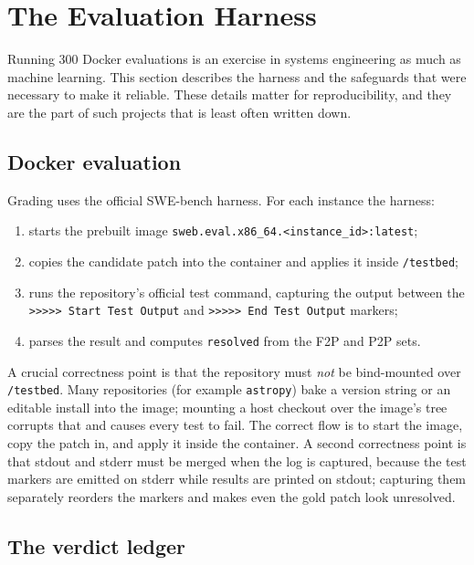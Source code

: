 \documentclass[11pt,a4paper]{article}
\begin{document}
\section{The Evaluation Harness}
\label{sec:harness}

Running 300 Docker evaluations is an exercise in systems engineering as much as machine
learning. This section describes the harness and the safeguards that were necessary to
make it reliable. These details matter for reproducibility, and they are the part of such
projects that is least often written down.

\subsection{Docker evaluation}

Grading uses the official SWE-bench harness. For each instance the harness:

\begin{enumerate}[leftmargin=1.4em]
  \item starts the prebuilt image \texttt{sweb.eval.x86\_64.<instance\_id>:latest};
  \item copies the candidate patch into the container and applies it inside
  \texttt{/testbed};
  \item runs the repository's official test command, capturing the output between the
  \texttt{>>>>> Start Test Output} and \texttt{>>>>> End Test Output} markers;
  \item parses the result and computes \texttt{resolved} from the F2P and P2P sets.
\end{enumerate}

A crucial correctness point is that the repository must \emph{not} be bind-mounted over
\texttt{/testbed}. Many repositories (for example \texttt{astropy}) bake a
version string or an editable install into the image; mounting a host checkout over the
image's tree corrupts that and causes every test to fail. The correct flow is to start
the image, copy the patch in, and apply it inside the container. A second correctness
point is that stdout and stderr must be merged when the log is captured, because the test
markers are emitted on stderr while results are printed on stdout; capturing them
separately reorders the markers and makes even the gold patch look unresolved.

\subsection{The verdict ledger}
\end{document}
